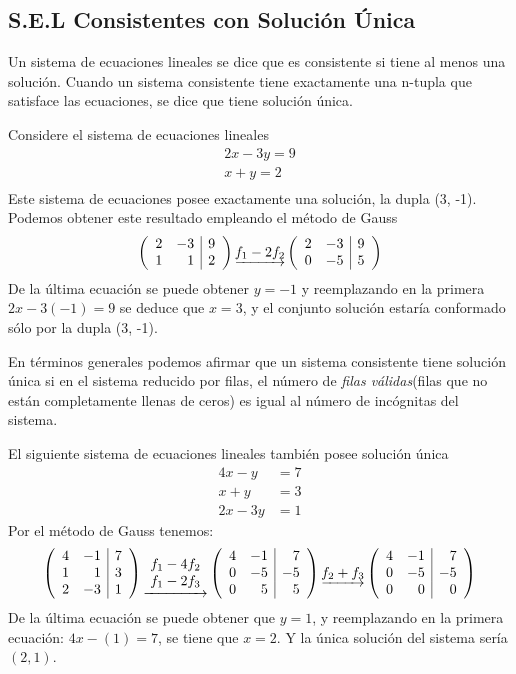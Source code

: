 \subsection{S.E.L Consistentes con Solución Única}
Un sistema de ecuaciones lineales se dice que es consistente si tiene al menos una solución. Cuando un sistema consistente tiene exactamente una n-tupla que satisface las ecuaciones, se dice que tiene solución única.

\begin{ejemplo}
Considere el sistema de ecuaciones lineales
\begin{align*}
2x-3y=9\\
x+y=2\\
\end{align*}
Este sistema de ecuaciones posee exactamente una solución, la dupla (3, -1). Podemos obtener este resultado empleando el método de Gauss
\begin{align*}
\reducir{rr|r}{
2&-3&9\\
1&1&2\\
}
\underrightarrow{f_1-2f_2}
\reducir{rr|r}{
2&-3&9\\
0&-5&5\\
}
\end{align*}
De la última ecuación se puede obtener $y=-1$ y reemplazando en la primera $2x-3(-1)=9$ se deduce que $x=3$, y el conjunto solución estaría conformado sólo por la dupla (3, -1).
\end{ejemplo}


En términos generales podemos afirmar que un sistema consistente tiene solución única si en el sistema reducido por filas, el número de \textit{filas válidas}(filas que no están completamente llenas de ceros) es igual al número de incógnitas del sistema. 


\begin{ejemplo}
El siguiente sistema de ecuaciones lineales también posee solución única
\begin{align*}
4x-y&=7\\
x+y&=3\\
2x-3y&=1
\end{align*}
Por el método de Gauss tenemos:
\begin{align*}
\reducir{rr|r}{
4&-1&7\\
1&1&3\\
2&-3&1\\
}
\underrightarrow{\begin{array}{c}
    f_1 - 4f_2  \\
    f_1 - 2f_3
\end{array}}
\reducir{rr|r}{
4&-1&7\\
0&-5&-5\\
0&5&5\\
}\underrightarrow{f_2 + f_3}
\reducir{rr|r}{
4&-1&7\\
0&-5&-5\\
0&0&0\\
}
\end{align*}
De la última ecuación se puede obtener que $y=1$, y reemplazando en la primera ecuación: $4x-(1)=7$, se tiene que $x=2$. Y la única solución del sistema sería $(2, 1)$.

\end{ejemplo}

